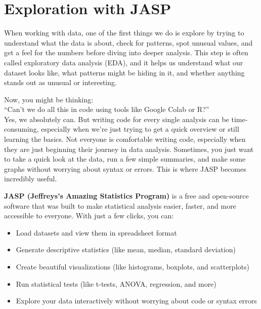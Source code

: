 \chapter{Exploration with JASP}

When working with data, one of the first things we do is explore by trying to understand what the data is about, check for patterns, spot unusual values, and get a feel for the numbers before diving into deeper analysis. This step is often called exploratory data analysis (EDA), and it helps us understand what our dataset looks like, what patterns might be hiding in it, and whether anything stands out as unusual or interesting.

Now, you might be thinking:\\
“Can’t we do all this in code using tools like Google Colab or R?”\\
Yes, we absolutely can. But writing code for every single analysis can be time-consuming, especially when we’re just trying to get a quick overview or still learning the basics. Not everyone is comfortable writing code, especially when they are just beginning their journey in data analysis. Sometimes, you just want to take a quick look at the data, run a few simple summaries, and make some graphs  without worrying about syntax or errors. This is where JASP becomes incredibly useful.

\textbf{JASP (Jeffreys’s Amazing Statistics Program)} is a free and open-source software that was built to make statistical analysis easier, faster, and more accessible to everyone. With just a few clicks, you can:

\begin{itemize}
    \item Load datasets and view them in spreadsheet format

    \item Generate descriptive statistics (like mean, median, standard deviation)

    \item Create beautiful visualizations (like histograms, boxplots, and scatterplots)

    \item Run statistical tests (like t-tests, ANOVA, regression, and more)

    \item Explore your data interactively without worrying about code or syntax errors

\end{itemize}

